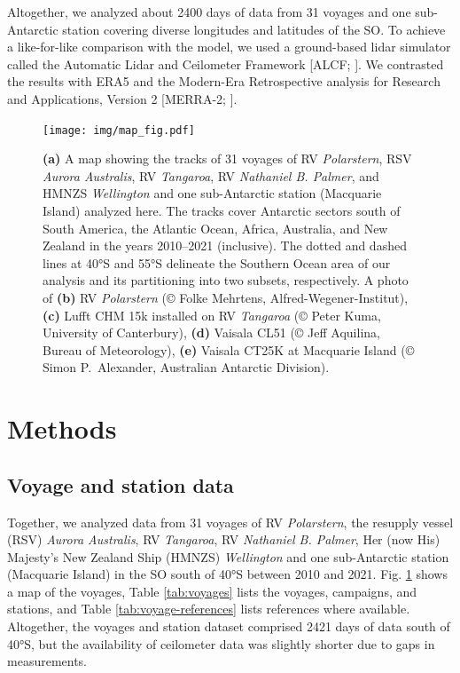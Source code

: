 \documentclass[draft]{agujournal2019}
\begin{document}
Altogether, we analyzed about 2400 days of data from 31 voyages and one sub-Antarctic station covering diverse longitudes and latitudes of the SO. To achieve a like-for-like comparison with the model, we used a ground-based lidar simulator called the Automatic Lidar and Ceilometer Framework [ALCF; ]. We contrasted the results with ERA5  and the Modern-Era Retrospective analysis for Research and Applications, Version 2 [MERRA-2; ].

\begin{figure}[b!]
\centering
\texttt{[image: img/map\_fig.pdf]}
\caption{
\textbf{(a)} A map showing the tracks of 31 voyages of RV \emph{Polarstern}, RSV \emph{Aurora Australis}, RV \emph{Tangaroa}, RV \emph{Nathaniel B. Palmer}, and HMNZS \emph{Wellington} and one sub-Antarctic station (Macquarie Island) analyzed here. The tracks cover Antarctic sectors south of South America, the Atlantic Ocean, Africa, Australia, and New Zealand in the years 2010--2021 (inclusive). The dotted and dashed lines at 40°S and 55°S delineate the Southern Ocean area of our analysis and its partitioning into two subsets, respectively. A photo of \textbf{(b)} RV \emph{Polarstern} (© Folke Mehrtens, Alfred-Wegener-Institut), \textbf{(c)} Lufft CHM 15k installed on RV \emph{Tangaroa} (© Peter Kuma, University of Canterbury), \textbf{(d)} Vaisala CL51 (© Jeff Aquilina, Bureau of Meteorology), \textbf{(e)} Vaisala CT25K at Macquarie Island (© Simon P.\ Alexander, Australian Antarctic Division).
}
\label{fig:map}
\end{figure}

\section{Methods}
\label{sec:methods}

\subsection{Voyage and station data}

Together, we analyzed data from 31 voyages of RV \emph{Polarstern}, the resupply vessel (RSV) \emph{Aurora Australis}, RV \emph{Tangaroa}, RV \emph{Nathaniel B. Palmer}, Her (now His) Majesty's New Zealand Ship (HMNZS) \emph{Wellington} and one sub-Antarctic station (Macquarie Island) in the SO south of 40°S between 2010 and 2021. Fig. \ref{fig:map} shows a map of the voyages, Table \ref{tab:voyages} lists the voyages, campaigns, and stations, and Table \ref{tab:voyage-references} lists references where available. Altogether, the voyages and station dataset comprised 2421 days of data south of 40°S, but the availability of ceilometer data was slightly shorter due to gaps in measurements.
\end{document}

